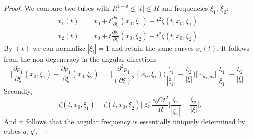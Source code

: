 \documentclass{amsart}
\theoremstyle{definition}
\begin{document}
\begin{proof}
We compare two tubes with $R^{1-\delta} \leq |t| \leq R$ and frequencies $\xi_1$, $\xi_2$:
\begin{equation*}
\begin{split}
x_1(t) &= x_0 + t \frac{\partial p_1 }{\partial \xi}(x_0,\xi_1) + t^2 \zeta(t,x_0,\xi_1), \\
x_2(t) &= x_0 + t \frac{\partial p_1 }{\partial \xi}(x_0,\xi_2) + t^2 \zeta(t,x_0,\xi_2).
\end{split}
\end{equation*}
By $(\star)$ we can normalize $| \xi_i | = 1$ and retain the same curves $x_i(t)$.
It follows from the non-degeneracy in the angular directions
\begin{equation*}
\big| \frac{\partial p_1}{\partial \xi}(x_0,\xi_1) - \frac{\partial p_1}{\partial \xi}(x_0,\xi_2) \big| = \big| \frac{\partial^2 p_1}{(\partial \xi)^2} (x_0,\xi_*) \big( \frac{\xi_1}{|\xi_1|} - \frac{\xi_2}{|\xi|} \big) \big| \sim_{d_1,d_2} \big| \frac{\xi_1}{|\xi_1|} - \frac{\xi_2}{|\xi|} \big|.
\end{equation*}
Secondly,
\begin{equation*}
\big| \zeta(t,x_0,\xi_1) - \zeta(t,x_0,\xi_2) \big| \lesssim \frac{\epsilon_0 C t^2 }{R} \big| \frac{\xi_1}{|\xi_1|} - \frac{\xi_2}{|\xi|} \big|. 
\end{equation*}
And it follows that the angular frequency is essentially uniquely determined by cubes $q$, $q'$.
\end{proof}
\end{document}
